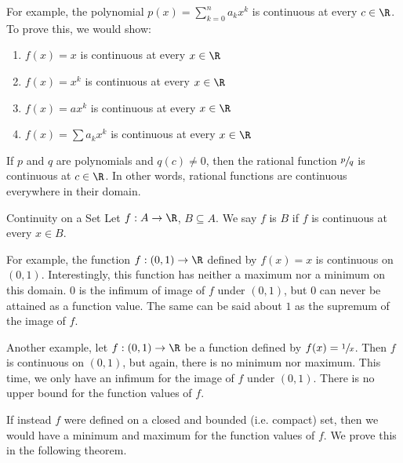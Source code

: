 For example, the polynomial $p(x) = \sum_{k=0}^{n} a_k x^k$ is continuous at every $c \in \R$. To prove this, we would show:
\begin{enumerate}
    \item $f(x)=x$ is continuous at every $x \in \R$
    \item $f(x) = x^k$ is continuous at every $x \in \R$
    \item $f(x) = ax^k$ is continuous at every $x \in \R$
    \item $f(x) = \sum a_k x^k$ is continuous at every $x \in \R$
\end{enumerate}

If $p$ and $q$ are polynomials and $q(c) \neq 0$, then the rational function $\sfrac{p}{q}$ is continuous at $c \in \R$. In other words, rational functions are continuous everywhere in their domain.

\begin{dfnbox}{Continuity on a Set}{}
    Let $f : A \to \R$, $B \subseteq A$. We say $f$ is  $B$ if $f$ is continuous at every $x \in B$.
\end{dfnbox}

For example, the function $f : (0,1) \to \R$ defined by $f(x) = x$ is continuous on $(0,1)$. Interestingly, this function has neither a maximum nor a minimum on this domain. $0$ is the infimum of image of $f$ under $(0,1)$, but $0$ can never be attained as a function value. The same can be said about $1$ as the supremum of the image of $f$.

Another example, let $f : (0,1) \to \R$ be a function defined by $f(x) = \sfrac{1}{x}$. Then $f$ is continuous on $(0,1)$, but again, there is no minimum nor maximum. This time, we only have an infimum for the image of $f$ under $(0,1)$. There is no upper bound for the function values of $f$.

If instead $f$ were defined on a closed and bounded (i.e. compact) set, then we would have a minimum and maximum for the function values of $f$. We prove this in the following theorem.

